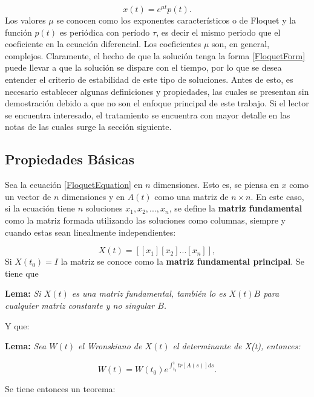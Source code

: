 \documentclass[a4paper,10pt]{report}
\begin{document}
\begin{equation}\label{FloquetForm}
x(t)=e^{\mu t}p(t).
\end{equation} Los valores $\mu$ se conocen como los exponentes característicos o de Floquet y la función $p(t)$ es periódica con período $\tau$, es decir el mismo periodo que el coeficiente en la ecuación diferencial. Los coeficientes $\mu$ son, en general, complejos. Claramente, el hecho de que la solución tenga la forma \ref{FloquetForm} puede llevar a que la solución se dispare con el tiempo, por lo que se desea entender el criterio de estabilidad de este tipo de soluciones. Antes de esto, es necesario establecer algunas definiciones y propiedades, las cuales se presentan sin demostración debido a que no son el enfoque principal de este trabajo. Si el lector se encuentra interesado, el tratamiento se encuentra con mayor detalle en las notas de las cuales surge la sección siguiente. \cite{WardFT}

\subsection{Propiedades Básicas}

Sea la ecuación \ref{FloquetEquation} en $n$ dimensiones. Esto es, se piensa en $x$ como un vector de $n$ dimensiones y en $A(t)$ como una matriz de $n \times n$. En este caso, si la ecuación tiene $n$ soluciones $x_1, x_2, ... , x_n$, se define la \textbf{matriz fundamental} como la matriz formada utilizando las soluciones como columnas, siempre y cuando estas sean linealmente independientes:

\begin{equation}
X(t) = [[x_1][x_2]...[x_n]],
\end{equation}Si $X(t_0) = I$ la matriz se conoce como la \textbf{matriz fundamental principal}. Se tiene que

\begin{center}
\textbf{Lema:} \textit{Si $X(t)$ es una matriz fundamental, también lo es $X(t)B$ para cualquier matriz constante y no singular $B$.}
\end{center}Y que:

\begin{center}
\textbf{Lema:} \textit{Sea $W(t)$ el Wronskiano de $X(t)$ el determinante de X(t), entonces:}

\begin{equation}
W(t) = W(t_0) e^{\int_{t_0}^{t}tr[A(s)]ds}.
\end{equation}
 
\end{center} Se tiene entonces un teorema:
\end{document}
